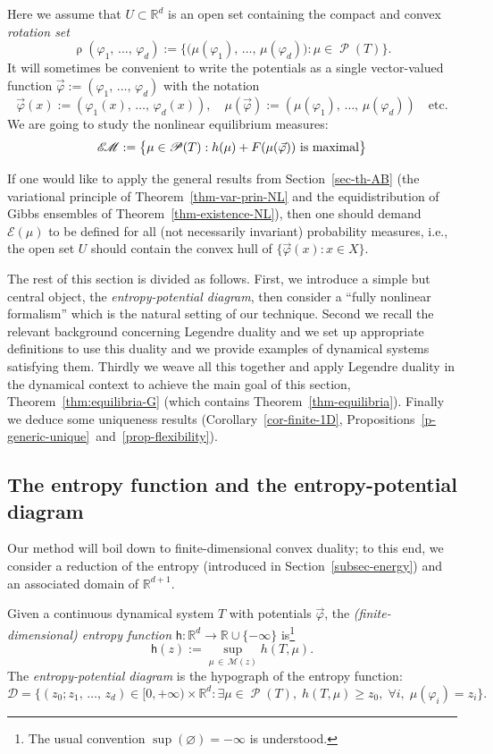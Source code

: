 \documentclass[AHL, Unicode, longabstracts,published]{cedram}
\theoremstyle{plain}
\theoremstyle{plain}
\newcommand\vpot{\vec\pot}
\newcommand\Prob{{\operatorname{\mathscr{P}}}}
\newcommand{\rs}{\operatorname{\rho}}
\newcommand{\hf}{\mathsf{h}}
\newcommand{\EM}{\mathscr{E\kern-2pt M}}
\newcommand{\pot}{\varphi}
\newcommand*\8{\infty}
\newcommand\RR{\mathbb{R}}
\newcommand{\En}{\mathcal{E}}
\newcommand{\cD}{\mathcal{D}}
\newcommand{\cM}{\mathcal{M}}
\let\oldexists\exists
\renewcommand*{\exists}{\mathrel{\oldexists}}
\let\oldforall\forall
\renewcommand*{\forall}{\mathrel{\oldforall}}
\begin{document}
Here we assume that $U\subset\RR^d$ is an open set containing the compact and convex \emph{rotation set}
\[
\rs(\pot_1,\,\dots,\,\pot_d) := \big\{\big(\mu(\pot_1),\,\dots,\,\mu(\pot_d)\big) \colon \mu\in\Prob(T) \big\}.
\]
It will sometimes be convenient to write the potentials as a single vector-valued function $\vpot := (\pot_1,\,\dots,\,\pot_d)$ with the notation
\[
\vpot(x) := (\pot_1(x),\,\dots,\,\pot_d(x)), \quad \mu(\vpot):=(\mu(\pot_1),\,\dots,\,\mu(\pot_d))\quad \text{etc.}
\]
We are going to study the nonlinear equilibrium measures:
\[
\EM := \big\{\mu\in\Prob(T):h(\mu)+F(\mu(\vpot))\text{ is maximal}\big\}
\]

\begin{rema}
If one would like to apply the general results from Section~\ref{sec-th-AB} (the variational principle of Theorem~\ref{thm-var-prin-NL} and the equidistribution of Gibbs ensembles of Theorem~\ref{thm-existence-NL}), then one should demand $\En(\mu)$ to be defined for all (not necessarily invariant) probability measures, i.e., the open set $U$ should contain the convex hull of $\{\vpot(x):x\in X\}$.
\end{rema}


The rest of this section is divided as follows. First, we introduce a simple but central object, the \emph{entropy-potential diagram}, then consider a ``fully nonlinear formalism'' which is the natural setting of our technique. Second we recall the relevant background concerning Legendre duality and we set up appropriate definitions to use this duality and we provide examples of dynamical systems satisfying them. Thirdly we weave all this together and apply Legendre duality in the dynamical context to achieve the main goal of this section, Theorem~\ref{thm:equilibria-G} (which contains Theorem~\ref{thm-equilibria}). Finally we deduce some uniqueness results (Corollary~\ref{cor-finite-1D}, Propositions~\ref{p-generic-unique}~and~\ref{prop-flexibility}).



\subsection{The entropy function and the entropy-potential diagram}

Our method will boil down to finite-dimensional convex duality; to this end, we consider a reduction of the entropy (introduced in Section~\ref{subsec-energy}) and an associated domain of $\RR^{d+1}$.

\begin{defi}\label{defi-entropy}
Given a continuous dynamical system $T$ with potentials $\vpot$, the \emph{(finite-dimensional) entropy function} $\hf:\RR^d\to\RR\cup\{-\infty\}$ is\footnote{The usual convention $\sup(\varnothing) = -\infty$ is understood.}
\[
\hf(z) := \sup_{\mu\,\in\,\cM(z)} h(T,\mu).
\]
The \emph{entropy-potential diagram} is the hypograph of the entropy function:
\[
\cD = \big\{ (z_0;z_1,\,\dots,\,z_d) \in [0,+\infty) \times \RR^d \colon \exists \mu\in \Prob(T),\; h(T,\mu)\ge z_0,\;\forall i,\;\mu(\pot_i)=z_i\big\}.
\]
\end{defi}
\end{document}
